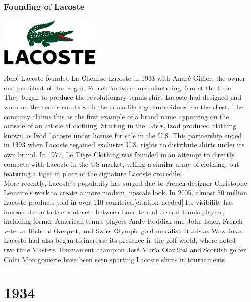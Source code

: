 \documentclass[11pt]{report}
\begin{document}
\section{}
\subsection{Founding of Lacoste}
\vspace{2mm}\begin{center}\includegraphics[width=5cm]{./img/lacosteLogo.jpg}\end{center}
René Lacoste founded La Chemise Lacoste in 1933 with André Gillier, the owner and president of the largest French knitwear manufacturing firm at the time. They began to produce the revolutionary tennis shirt Lacoste had designed and worn on the tennis courts with the crocodile logo embroidered on the chest. The company claims this as the first example of a brand name appearing on the outside of an article of clothing. Starting in the 1950s, Izod produced clothing known as Izod Lacoste under license for sale in the U.S. This partnership ended in 1993 when Lacoste regained exclusive U.S. rights to distribute shirts under its own brand. In 1977, Le Tigre Clothing was founded in an attempt to directly compete with Lacoste in the US market, selling a similar array of clothing, but featuring a tiger in place of the signature Lacoste crocodile.\\
\indent More recently, Lacoste's popularity has surged due to French designer Christophe Lemaire’s work to create a more modern, upscale look. In 2005, almost 50 million Lacoste products sold in over 110 countries.[citation needed] Its visibility has increased due to the contracts between Lacoste and several tennis players, including former American tennis players Andy Roddick and John Isner, French veteran Richard Gasquet, and Swiss Olympic gold medalist Stanislas Wawrinka. Lacoste had also begun to increase its presence in the golf world, where noted two time Masters Tournament champion José María Olazábal and Scottish golfer Colin Montgomerie have been seen sporting Lacoste shirts in tournaments.

\chapter{1934}
\end{document}
